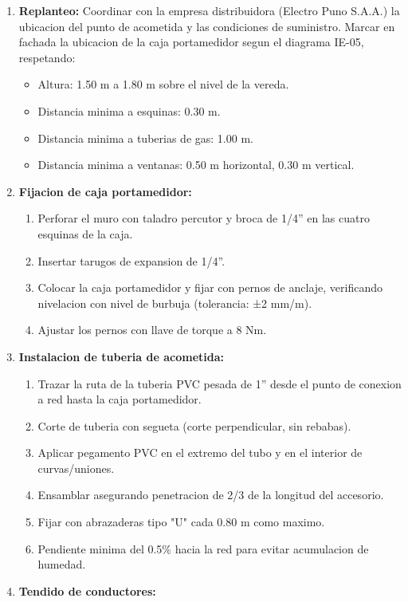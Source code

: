 \begin{enumerate}
  \item \textbf{Replanteo:} Coordinar con la empresa distribuidora (Electro Puno S.A.A.) la ubicacion del punto de acometida y las condiciones de suministro. Marcar en fachada la ubicacion de la caja portamedidor segun el diagrama IE-05, respetando:
  \begin{itemize}
    \item Altura: 1.50 m a 1.80 m sobre el nivel de la vereda.
    \item Distancia minima a esquinas: 0.30 m.
    \item Distancia minima a tuberias de gas: 1.00 m.
    \item Distancia minima a ventanas: 0.50 m horizontal, 0.30 m vertical.
  \end{itemize}
  \item \textbf{Fijacion de caja portamedidor:}
  \begin{enumerate}
    \item Perforar el muro con taladro percutor y broca de 1/4'' en las cuatro esquinas de la caja.
    \item Insertar tarugos de expansion de 1/4''.
    \item Colocar la caja portamedidor y fijar con pernos de anclaje, verificando nivelacion con nivel de burbuja (tolerancia: ±2 mm/m).
    \item Ajustar los pernos con llave de torque a 8 Nm.
  \end{enumerate}
  \item \textbf{Instalacion de tuberia de acometida:}
  \begin{enumerate}
    \item Trazar la ruta de la tuberia PVC pesada de 1'' desde el punto de conexion a red hasta la caja portamedidor.
    \item Corte de tuberia con segueta (corte perpendicular, sin rebabas).
    \item Aplicar pegamento PVC en el extremo del tubo y en el interior de curvas/uniones.
    \item Ensamblar asegurando penetracion de 2/3 de la longitud del accesorio.
    \item Fijar con abrazaderas tipo "U" cada 0.80 m como maximo.
    \item Pendiente minima del 0.5\% hacia la red para evitar acumulacion de humedad.
  \end{enumerate}
  \item \textbf{Tendido de conductores:}

\end{enumerate}
